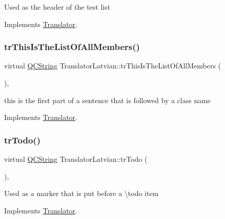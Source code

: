 Used as the header of the test list 

Implements \mbox{\hyperlink{class_translator}{Translator}}.

\mbox{\label{class_translator_latvian_a87c54590b98c9c3741c5c6e99823f9ba}} 
\subsubsection{\texorpdfstring{trThisIsTheListOfAllMembers()}{trThisIsTheListOfAllMembers()}}
{\footnotesize\ttfamily virtual \mbox{\hyperlink{class_q_c_string}{Q\+C\+String}} Translator\+Latvian\+::tr\+This\+Is\+The\+List\+Of\+All\+Members (\begin{DoxyParamCaption}{ }\end{DoxyParamCaption})\hspace{0.3cm}{\ttfamily [inline]}, {\ttfamily [virtual]}}

this is the first part of a sentence that is followed by a class name 

Implements \mbox{\hyperlink{class_translator}{Translator}}.

\mbox{\label{class_translator_latvian_ad24f03043167f6fcbb22f6b6466a4821}} 
\subsubsection{\texorpdfstring{trTodo()}{trTodo()}}
{\footnotesize\ttfamily virtual \mbox{\hyperlink{class_q_c_string}{Q\+C\+String}} Translator\+Latvian\+::tr\+Todo (\begin{DoxyParamCaption}{ }\end{DoxyParamCaption})\hspace{0.3cm}{\ttfamily [inline]}, {\ttfamily [virtual]}}

Used as a marker that is put before a \textbackslash{}todo item 

Implements \mbox{\hyperlink{class_translator}{Translator}}.

\mbox{\label{class_translator_latvian_aeddd351f59b60261ba93ec27141854ff}} 
